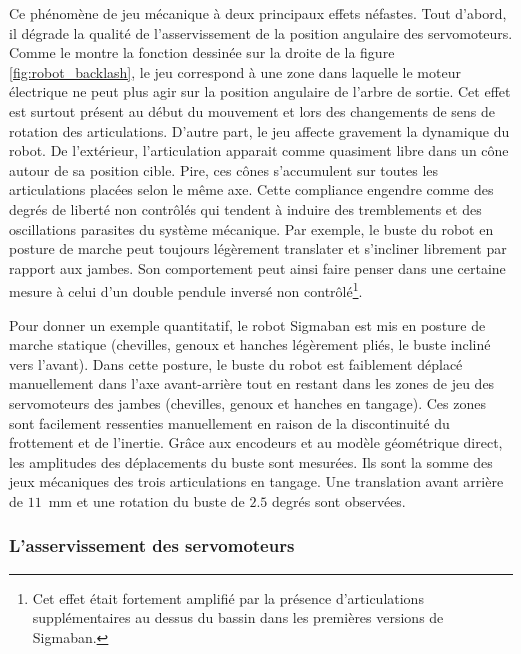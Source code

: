 Ce phénomène de jeu mécanique à deux principaux effets néfastes.
Tout d'abord, il dégrade la qualité de l'asservissement de la position 
angulaire des servomoteurs.
Comme le montre la fonction dessinée sur la droite de la figure \ref{fig:robot_backlash},
le jeu correspond à une zone dans laquelle le moteur électrique ne peut plus 
agir sur la position angulaire de l'arbre de sortie.
Cet effet est surtout présent au début du mouvement et lors
des changements de sens de rotation des articulations.
D'autre part, le jeu affecte gravement la dynamique du robot. 
De l'extérieur, l'articulation apparait comme quasiment libre dans un cône
autour de sa position cible.
Pire, ces cônes s'accumulent sur toutes les articulations placées selon le même axe.
Cette \og compliance \fg engendre comme des degrés de liberté non contrôlés qui 
tendent à induire des tremblements et des oscillations parasites du système mécanique.
Par exemple, le buste du robot en posture de marche peut toujours 
légèrement translater et s'incliner librement par rapport aux jambes.
Son comportement peut ainsi faire penser dans une certaine mesure à celui d'un double 
pendule inversé non contrôlé\footnote{Cet effet était fortement amplifié par 
la présence d'articulations supplémentaires au dessus du bassin dans les 
premières versions de Sigmaban.}.

Pour donner un exemple quantitatif, le robot Sigmaban est mis en posture de marche statique
(chevilles, genoux et hanches légèrement pliés, le buste incliné vers l'avant).
Dans cette posture, le buste du robot est faiblement déplacé manuellement 
dans l'axe avant-arrière tout en restant dans les zones de jeu des servomoteurs
des jambes (chevilles, genoux et hanches en tangage).
Ces zones sont facilement ressenties manuellement en raison de la discontinuité 
du frottement et de l'inertie.
Grâce aux encodeurs et au modèle géométrique direct, les amplitudes des déplacements 
du buste sont mesurées. 
Ils sont la somme des jeux mécaniques des trois articulations en tangage.
Une translation avant arrière de $11$~mm et une rotation du buste de $2.5$ degrés
sont observées.

\subsubsection{L'asservissement des servomoteurs}

